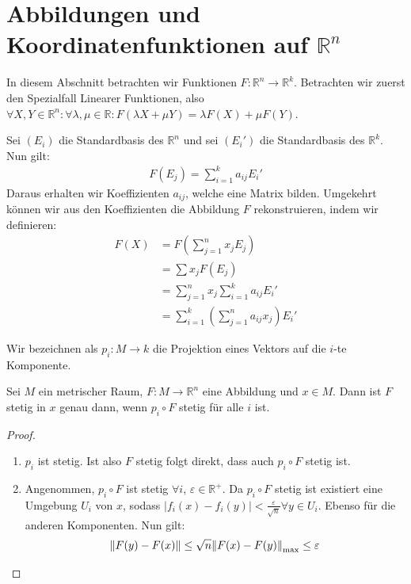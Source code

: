 \documentclass{report}
\renewcommand\epsilon{\varepsilon}
\newcommand*{\newpar}{\par\vspace{\baselineskip}\noindent}
\newcommand{\bR}{\mathbb{R}}
\begin{document}
%
%
%
%
\section{Abbildungen und Koordinatenfunktionen auf $\bR^n$}
In diesem Abschnitt betrachten wir Funktionen $F: \bR^n \to \bR^k$. Betrachten wir zuerst den Spezialfall Linearer Funktionen, also $\forall X,Y \in \bR^n : \forall \lambda, \mu \in \bR : F(\lambda X + \mu Y) = \lambda F(X) + \mu F(Y)$.
\newpar
Sei $(E_i)$ die Standardbasis des $\bR^n$ und sei $(E_i')$ die Standardbasis des $\bR^k$. Nun gilt:
\begin{align*}
 F(E_j) = \sum_{i=1}^k a_{ij} E_i'
\end{align*}
Daraus erhalten wir Koeffizienten $a_{ij}$, welche eine Matrix bilden. Umgekehrt können wir aus den Koeffizienten die Abbildung $F$ rekonstruieren, indem wir definieren:
\begin{align*}
 F(X) &= F\left(\sum_{j=1}^n x_j E_j\right) \\
 &= \sum x_j F(E_j) \\
 &= \sum_{j=1}^n x_j \sum_{i=1}^k a_{ij} E_i'\\
 &= \sum_{i=1}^k \left(\sum_{j=1}^n a_{ij} x_j\right) E_i'
\end{align*}
%
%
%
%
%
%
%
%
%
%
%
%
%
%
%
\newpage
\begin{definition}
 Wir bezeichnen als $p_i : M \to k$ die Projektion eines Vektors auf die $i$-te Komponente.
\end{definition}
\begin{theorem}
\label{theorem:componentwisecontinuous}
 Sei $M$ ein metrischer Raum, $F : M \to \bR^n$ eine Abbildung und $x \in M$. Dann ist $F$ stetig in $x$ genau dann, wenn $p_i \circ F$ stetig für alle $i$ ist.
\end{theorem}
\begin{proof}
\begin{enumerate}
 \item $p_i$ ist stetig. Ist also $F$ stetig folgt direkt, dass auch $p_i \circ F$ stetig ist.
 \item Angenommen, $p_i \circ F$ ist stetig $\forall i$, $\epsilon \in \bR^+$. Da $p_i \circ F$ stetig ist existiert eine Umgebung $U_i$ von $x$, sodass $|f_i(x) - f_i(y)| < \frac{\epsilon}{\sqrt{n}} \forall y \in U_i$. Ebenso für die anderen Komponenten. Nun gilt:
 \begin{align*}
  \norm{F(y) - F(x)} \leq \sqrt{n} \norm{F(x) - F(y)}_{\max} \leq \epsilon
 \end{align*}
\end{enumerate} 
\end{proof}
\end{document}
